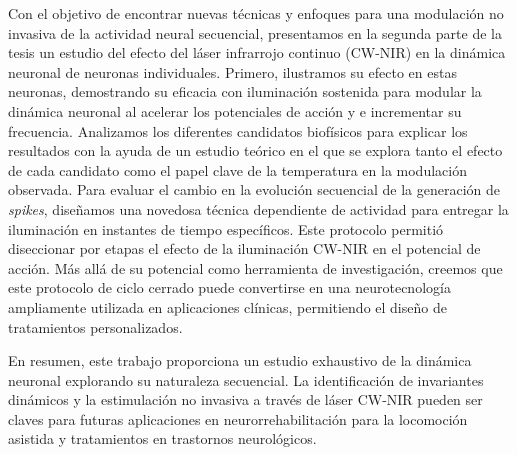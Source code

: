 Con el objetivo de encontrar nuevas técnicas y enfoques para una modulación no invasiva de la actividad neural secuencial, presentamos en la segunda parte de la tesis un estudio del efecto del láser infrarrojo continuo (CW-NIR) en la dinámica neuronal de neuronas individuales. Primero, ilustramos su efecto en estas neuronas, demostrando su eficacia con iluminación sostenida para modular la dinámica neuronal al acelerar los potenciales de acción y e incrementar su frecuencia. Analizamos los diferentes candidatos biofísicos para explicar los resultados con la ayuda de un estudio teórico en el que se explora tanto el efecto de cada candidato como el papel clave de la temperatura en la modulación observada. Para evaluar el cambio en la evolución secuencial de la generación de \textit{spikes}, diseñamos una novedosa técnica dependiente de actividad para entregar la iluminación en instantes de tiempo específicos. Este protocolo permitió diseccionar por etapas el efecto de la iluminación CW-NIR en el potencial de acción. Más allá de su potencial como herramienta de investigación, creemos que este protocolo de ciclo cerrado puede convertirse en una neurotecnología ampliamente utilizada en aplicaciones clínicas, permitiendo el diseño de tratamientos personalizados.

En resumen, este trabajo proporciona un estudio exhaustivo de la dinámica neuronal explorando su naturaleza secuencial. La identificación de invariantes dinámicos y la estimulación no invasiva a través de láser CW-NIR pueden ser claves para futuras aplicaciones en neurorrehabilitación para la locomoción asistida y tratamientos en trastornos neurológicos.